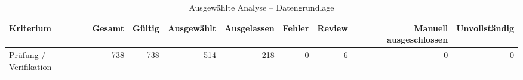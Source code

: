 \begin{table}[htbp]
\centering
\caption{Ausgewählte Analyse -- Datengrundlage}
\begin{tabular}{lrrrrrrrr}
\toprule
Kriterium & Gesamt & Gültig & Ausgewählt & Ausgelassen & Fehler & Review & Manuell ausgeschlossen & Unvollständig \\
\midrule
Prüfung / Verifikation & 738 & 738 & 514 & 218 & 0 & 6 & 0 & 0 \\
\bottomrule
\end{tabular}
\end{table}
